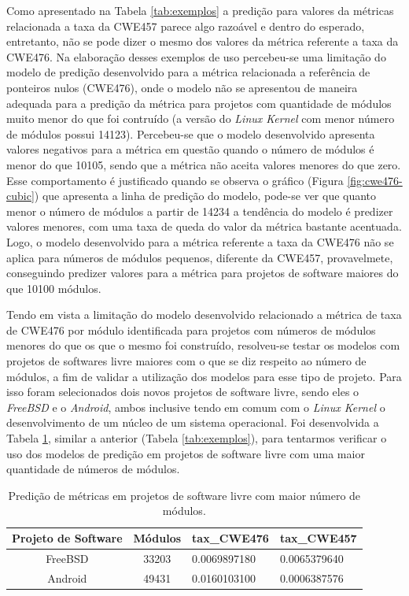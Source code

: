 Como apresentado na Tabela \ref{tab:exemplos} a predição para valores da
métricas relacionada a taxa da CWE457 parece algo razoável e dentro do esperado,
entretanto, não se pode dizer o mesmo dos valores da métrica referente a taxa da
CWE476. Na elaboração desses exemplos de uso percebeu-se uma limitação do
modelo de predição desenvolvido para a métrica relacionada a referência de
ponteiros nulos (CWE476), onde o modelo não se apresentou de maneira adequada
para a predição da métrica para projetos com quantidade de módulos muito menor
do que foi contruído (a versão do \textit{Linux Kernel} com menor número de
módulos possui 14123). Percebeu-se que o modelo desenvolvido apresenta valores
negativos para a métrica em questão quando o número de módulos é menor do que
10105, sendo que a métrica não aceita valores menores do que zero. Esse
comportamento é justificado quando se observa o gráfico (Figura
\ref{fig:cwe476-cubic}) que apresenta a linha de predição do modelo, pode-se ver
que quanto menor o número de módulos a partir de 14234 a tendência do modelo é
predizer valores menores, com uma taxa de queda do valor da métrica bastante
acentuada. Logo, o modelo desenvolvido para a métrica referente a taxa da CWE476
não se aplica para números de módulos pequenos, diferente da CWE457,
provavelmete, conseguindo predizer valores para a métrica para projetos de
software maiores do que 10100 módulos.

Tendo em vista a limitação do modelo desenvolvido relacionado a métrica de taxa
de CWE476 por módulo identificada para projetos com números de módulos menores
do que os que o mesmo foi construído, resolveu-se testar os modelos com projetos
de softwares livre maiores com o que se diz respeito ao número de módulos, a fim
de validar a utilização dos modelos para esse tipo de projeto. Para isso foram
selecionados dois novos projetos de software livre, sendo eles o
\textit{FreeBSD} e o \textit{Android}, ambos inclusive tendo em comum com o
\textit{Linux Kernel} o desenvolvimento de um núcleo de um sistema operacional.
Foi desenvolvida a Tabela \ref{tab:exemplos2}, similar a anterior (Tabela
\ref{tab:exemplos}), para tentarmos verificar o uso dos modelos de predição em
projetos de software livre com uma maior quantidade de números de módulos.

\begin{table}[h]
 \centering
 \begin{tabular}{ccll}
  \hline
  \rowcolor[HTML]{EFEFEF} 
  Projeto de Software & Módulos &
  \multicolumn{1}{c}{\cellcolor[HTML]{EFEFEF}tax\_CWE476} &
  \multicolumn{1}{c}{\cellcolor[HTML]{EFEFEF}tax\_CWE457} \\ \hline
  FreeBSD             & 33203   & 0.0069897180
  & 0.0065379640                                           \\ \hline
  Android             & 49431   & 0.0160103100
  & 0.0006387576                                          \\ \hline
 \end{tabular}
 \caption{Predição de métricas em projetos de software livre com maior número
 de módulos.}
 \label{tab:exemplos2}
\end{table}

